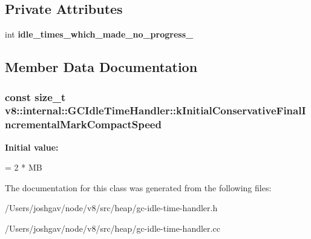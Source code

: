 \subsection*{Private Attributes}
\begin{DoxyCompactItemize}
\item 
int {\bfseries idle\+\_\+times\+\_\+which\+\_\+made\+\_\+no\+\_\+progress\+\_\+}\hypertarget{classv8_1_1internal_1_1_g_c_idle_time_handler_a39c0ea4e90561e1da8f662b3f1b572b4}{}\label{classv8_1_1internal_1_1_g_c_idle_time_handler_a39c0ea4e90561e1da8f662b3f1b572b4}

\end{DoxyCompactItemize}


\subsection{Member Data Documentation}
\subsubsection[{\texorpdfstring{k\+Initial\+Conservative\+Final\+Incremental\+Mark\+Compact\+Speed}{kInitialConservativeFinalIncrementalMarkCompactSpeed}}]{\setlength{\rightskip}{0pt plus 5cm}const size\+\_\+t v8\+::internal\+::\+G\+C\+Idle\+Time\+Handler\+::k\+Initial\+Conservative\+Final\+Incremental\+Mark\+Compact\+Speed\hspace{0.3cm}{\ttfamily [static]}}\hypertarget{classv8_1_1internal_1_1_g_c_idle_time_handler_a3cb5f70b983d7221ee62a57d6650a279}{}\label{classv8_1_1internal_1_1_g_c_idle_time_handler_a3cb5f70b983d7221ee62a57d6650a279}
{\bfseries Initial value\+:}
\begin{DoxyCode}
=
      2 * MB
\end{DoxyCode}


The documentation for this class was generated from the following files\+:\begin{DoxyCompactItemize}
\item 
/\+Users/joshgav/node/v8/src/heap/gc-\/idle-\/time-\/handler.\+h\item 
/\+Users/joshgav/node/v8/src/heap/gc-\/idle-\/time-\/handler.\+cc\end{DoxyCompactItemize}

